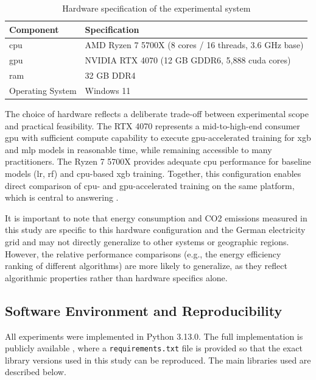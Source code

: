 \begin{table}[htbp]
\centering
\caption{Hardware specification of the experimental system}
\label{tab:hardware}
\begin{tabular}{ll}
\toprule
\textbf{Component} & \textbf{Specification} \\
\midrule
\gls{cpu} & AMD Ryzen 7 5700X (8 cores / 16 threads, 3.6 GHz base) \\
\gls{gpu} & NVIDIA RTX 4070 (12 GB GDDR6, 5{,}888 \gls{cuda} cores) \\
\gls{ram} & 32 GB DDR4 \\
Operating System & Windows 11 \\
\bottomrule
\end{tabular}
\end{table}

The choice of hardware reflects a deliberate trade-off between experimental scope and practical feasibility. The RTX 4070 represents a mid-to-high-end consumer \gls{gpu} with sufficient compute capability to execute \gls{gpu}-accelerated training for \gls{xgb} and \gls{mlp} models in reasonable time, while remaining accessible to many practitioners. The Ryzen 7 5700X provides adequate \gls{cpu} performance for baseline models (\gls{lr}, \gls{rf}) and \gls{cpu}-based \gls{xgb} training. Together, this configuration enables direct comparison of \gls{cpu}- and \gls{gpu}-accelerated training on the same platform, which is central to answering .

It is important to note that energy consumption and CO2 emissions measured in this study are specific to this hardware configuration and the German electricity grid and may not directly generalize to other systems or geographic regions. However, the relative performance comparisons (e.g., the energy efficiency ranking of different algorithms) are more likely to generalize, as they reflect algorithmic properties rather than hardware specifics alone.

\subsection{Software Environment and Reproducibility}
\label{implementation_sw_env}

All experiments were implemented in Python 3.13.0. The full implementation is  publicly available \cite{qorriBThesisEronQorri2025}, where a \texttt{requirements.txt} file is provided so that the exact library versions used in this study can be reproduced. The main libraries used are described below.

